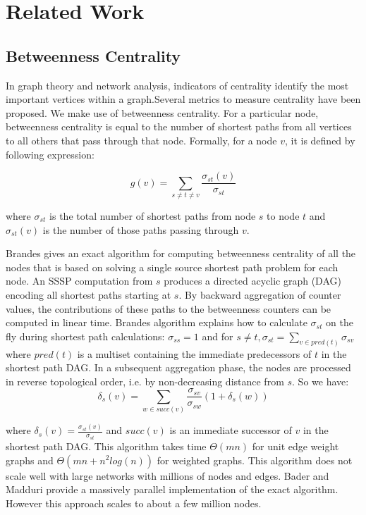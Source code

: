 \documentclass[runningheads,a4paper]{llncs}
\begin{document}
\section{Related Work}

\subsection*{Betweenness Centrality}
In graph theory and network analysis, indicators of centrality identify the most important vertices within a graph.Several metrics to measure centrality have been proposed. We make use of betweenness centrality. For a particular node, betweenness centrality is equal to the number of shortest paths from all vertices to all others that pass through that node. Formally, for a node $v$, it is defined by following expression:

$$g(v) = \sum_{s \neq t \neq v} \frac{\sigma_{st}(v)}{\sigma_{st}}$$

where $\sigma_{st}$ is the total number of shortest paths from node $s$ to node $t$ and $\sigma_{st}(v)$ is the number of those paths passing through $v$.

Brandes\cite{brandes} gives an exact algorithm for computing betweenness centrality of all the nodes that is based on solving a single source shortest path problem for each node. An SSSP computation from $s$ produces a directed acyclic graph (DAG) encoding all shortest paths starting at $s$. By backward aggregation of counter values, the contributions of these paths to the betweenness counters can be computed in linear time. Brandes algorithm explains how to calculate $\sigma_{st}$ on the fly during shortest path calculations: $\sigma_{ss} = 1$ and for $s \neq t, \sigma_{st} = \sum_{v \in pred(t)} \sigma_{sv}$ where $pred(t)$ is a multiset containing the immediate predecessors of  $t$ in the shortest path DAG. In a subsequent aggregation phase, the nodes are processed in reverse topological order, i.e. by non-decreasing distance from $s$. So we have: 
$$\delta_{s}(v) = \sum_{w \in succ(v)} \frac{\sigma_{sv}}{\sigma_{sw}}(1+\delta_{s}(w))$$

where $\delta_{s}(v) = \frac{\sigma_{st}(v)}{\sigma_{st}}$ and $succ(v)$ is an immediate successor of $v$  in the shortest path DAG.   
This algorithm takes time $\Theta(mn)$ for unit edge weight graphs and $\Theta(mn + n^{2}log(n))$ for weighted graphs. This algorithm does not scale well with large networks with millions of nodes and edges. Bader and Madduri\cite{bader} provide a massively parallel implementation of the exact algorithm. However this approach scales to about a few million nodes. 
\end{document}
